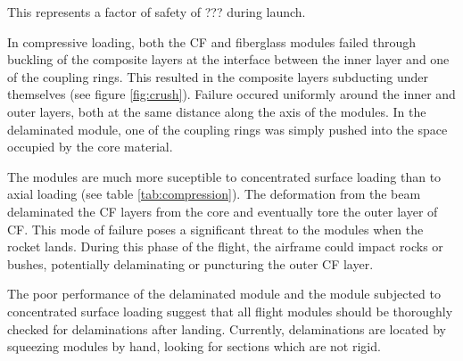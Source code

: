 \documentclass{aiaa-tc}%
\begin{document}
This represents a factor of safety of ???
during launch.

In compressive loading, both the CF and fiberglass modules failed through buckling of the composite layers at the interface between the inner layer and one of the coupling rings.
This resulted in the composite layers subducting under themselves (see figure \ref{fig:crush}).
Failure occured uniformly around the inner and outer layers, both at the same distance along the axis of the modules. 
In the delaminated module, one of the coupling rings was simply pushed into the space occupied by the core material.

The modules are much more suceptible to concentrated surface loading than to axial loading (see table \ref{tab:compression}). 
The deformation from the beam delaminated the CF layers from the core and eventually tore the outer layer of CF. 
This mode of failure poses a significant threat to the modules when the rocket lands. 
During this phase of the flight, the airframe could impact rocks or bushes, potentially delaminating or puncturing the outer CF layer. 

The poor performance of the delaminated module and the module subjected to concentrated surface loading suggest that all flight modules should be thoroughly checked for delaminations after landing. 
Currently, delaminations are located by squeezing modules by hand, looking for sections which are not rigid. 
\end{document}
